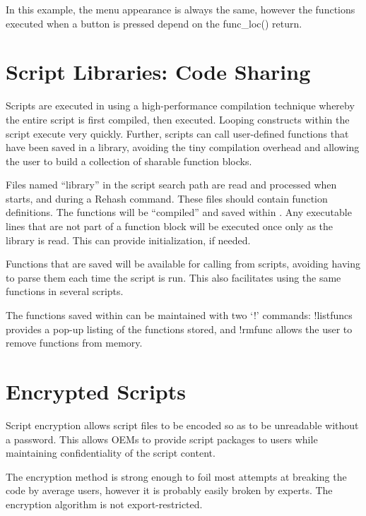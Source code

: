 In this example, the menu appearance is always the same, however the
functions executed when a button is pressed depend on the {\vt
func\_loc()} return.


\section{Script Libraries: Code Sharing}
\label{scrlib}

Scripts are executed in {\Xic} using a high-performance compilation
technique whereby the entire script is first compiled, then executed.
Looping constructs within the script execute very quickly.  Further,
scripts can call user-defined functions that have been saved in a
library, avoiding the tiny compilation overhead and allowing the
user to build a collection of sharable function blocks.

Files named ``{\vt library}'' in the script search path are read and
processed when {\Xic} starts, and during a {\cb Rehash} command. 
These files should contain function definitions.  The functions will
be ``compiled'' and saved within {\Xic}.  Any executable lines that
are not part of a function block will be executed once only as the
library is read.  This can provide initialization, if needed.

Functions that are saved will be available for calling from scripts,
avoiding having to parse them each time the script is run.  This also
facilitates using the same functions in several scripts.

The functions saved within {\Xic} can be maintained with two `!'
commands:  {\cb !listfuncs} provides a pop-up listing of the functions
stored, and {\cb !rmfunc} allows the user to remove functions from
memory.


\section{Encrypted Scripts}

Script encryption allows script files to be encoded so as to be
unreadable without a password.  This allows OEMs to provide script
packages to users while maintaining confidentiality of the script
content.

The encryption method is strong enough to foil most attempts at
breaking the code by average users, however it is probably easily
broken by experts.  The encryption algorithm is not export-restricted.

